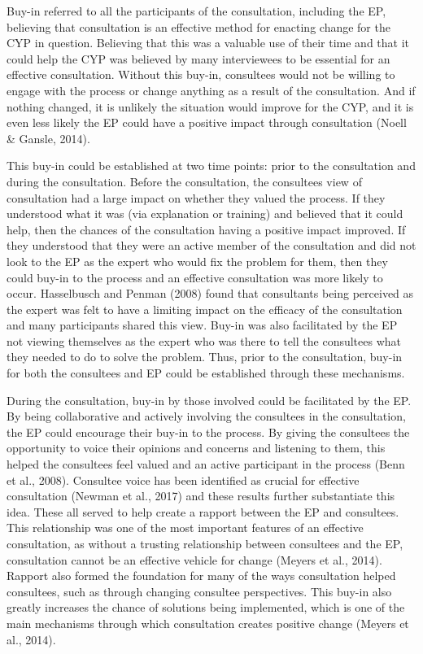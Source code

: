 \documentclass[
  english,
  man,floatsintext]{apa6}
\begin{document}
Buy-in referred to all the participants of the consultation, including
the EP, believing that consultation is an effective method for enacting
change for the CYP in question. Believing that this was a valuable use
of their time and that it could help the CYP was believed by many
interviewees to be essential for an effective consultation. Without this
buy-in, consultees would not be willing to engage with the process or
change anything as a result of the consultation. And if nothing changed,
it is unlikely the situation would improve for the CYP, and it is even
less likely the EP could have a positive impact through consultation
(Noell \& Gansle, 2014).

This buy-in could be established at two time points: prior to the
consultation and during the consultation. Before the consultation, the
consultees view of consultation had a large impact on whether they
valued the process. If they understood what it was (via explanation or
training) and believed that it could help, then the chances of the
consultation having a positive impact improved. If they understood that
they were an active member of the consultation and did not look to the
EP as the expert who would fix the problem for them, then they could
buy-in to the process and an effective consultation was more likely to
occur. Hasselbusch and Penman (2008) found that
consultants being perceived as the expert was felt to have a limiting
impact on the efficacy of the consultation and many participants shared
this view. Buy-in was also facilitated by the EP not viewing themselves
as the expert who was there to tell the consultees what they needed to
do to solve the problem. Thus, prior to the consultation, buy-in for
both the consultees and EP could be established through these
mechanisms.

During the consultation, buy-in by those involved could be facilitated
by the EP. By being collaborative and actively involving the consultees
in the consultation, the EP could encourage their buy-in to the process.
By giving the consultees the opportunity to voice their opinions and
concerns and listening to them, this helped the consultees feel valued
and an active participant in the process
(Benn et al., 2008). Consultee voice has been
identified as crucial for effective consultation
(Newman et al., 2017) and these results
further substantiate this idea. These all served to help create a
rapport between the EP and consultees. This relationship was one of the
most important features of an effective consultation, as without a
trusting relationship between consultees and the EP, consultation cannot
be an effective vehicle for change (Meyers et al., 2014).
Rapport also formed the foundation for many of the ways consultation
helped consultees, such as through changing consultee perspectives. This
buy-in also greatly increases the chance of solutions being implemented,
which is one of the main mechanisms through which consultation creates
positive change (Meyers et al., 2014).
\end{document}
